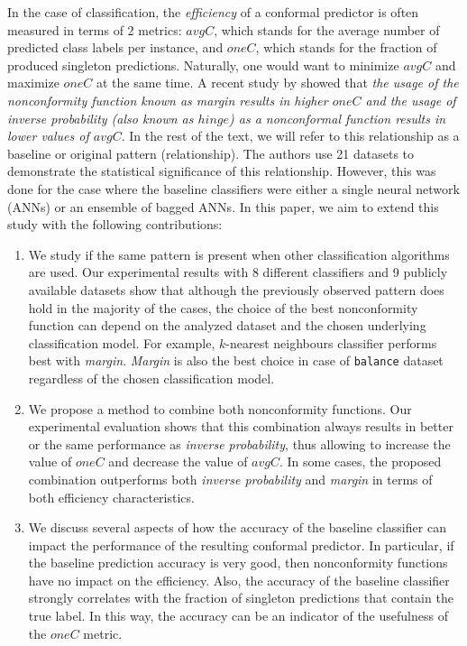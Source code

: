 In the case of classification, the \textit{efficiency} of a conformal predictor is often measured in terms of 2 metrics: $avgC$, which stands for the average 
number of predicted class labels per instance, and $oneC$, which stands for 
the fraction of produced singleton predictions. 
Naturally, one would want to minimize $avgC$ and maximize $oneC$ at the
same time.
A recent study by \cite{johansson2017model} showed that \emph{the usage of the nonconformity
function known as \textit{margin} results in higher $oneC$ and the usage of \textit{inverse probability} (also known as $hinge$) as a nonconformal function results in lower
values of $avgC$}.
In the rest of the text, we will refer to this relationship as a baseline or original pattern
(relationship).
The authors use 21 datasets to demonstrate the statistical significance of this relationship. However, this was done for the case where the baseline classifiers were either  a single neural network (ANNs) or an ensemble of bagged ANNs. In this paper, we aim to extend this study with the following contributions:
\begin{enumerate}
    \item We study if the same pattern is present when other
    classification algorithms are used. Our experimental results with 8 
    different classifiers and 9 publicly available datasets show that although
    the previously observed pattern does hold in the majority of the cases, 
    the choice of the best nonconformity function can depend on the analyzed 
    dataset and the chosen underlying classification model. For example, 
    $k$-nearest neighbours classifier performs best with \textit{margin}.
    \textit{Margin} is also the best choice in case of \verb|balance| dataset
    regardless of the chosen classification model.

    \item We propose a method to combine both nonconformity functions. 
    Our experimental evaluation shows that this combination always results 
    in better or the same performance as \textit{inverse probability}, thus 
    allowing to increase the value of $oneC$ and decrease the value of
    $avgC$.
    In some cases, the proposed combination outperforms both 
    \textit{inverse probability} and \textit{margin} in terms of both efficiency characteristics.
    
    \item We discuss several aspects of how the accuracy of the baseline 
    classifier can impact the performance of the resulting conformal
    predictor. In particular, if the baseline prediction accuracy is very
    good, then nonconformity
    functions have no impact on the efficiency.
    Also, the accuracy of the baseline classifier strongly correlates
    with the fraction of singleton predictions that contain the true label.
    In this way, the accuracy can be an indicator of the usefulness of the $oneC$
    metric.

\end{enumerate}
 

